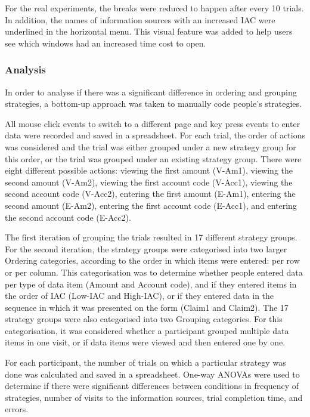 \begin{table}
\begin{itemize}
For the real experiments, the breaks were reduced to happen after every 10 trials. In addition, the names of information sources with an increased IAC were underlined in the horizontal menu. This visual feature was added to help users see which windows had an increased time cost to open.

\subsubsection{Analysis}
In order to analyse if there was a significant difference in ordering and grouping strategies, a bottom-up approach was taken to manually code people's strategies.

All mouse click events to switch to a different page and key press events to enter data were recorded and saved in a spreadsheet. For each trial, the order of actions was considered and the trial was either grouped under a new strategy group for this order, or the trial was grouped under an existing strategy group. There were eight different possible actions: viewing the first amount (V-Am1), viewing the second amount (V-Am2), viewing the first account code (V-Acc1), viewing the second account code (V-Acc2), entering the first amount (E-Am1), entering the second amount (E-Am2), entering the first account code (E-Acc1), and entering the second account code (E-Acc2).

The first iteration of grouping the trials resulted in 17 different strategy groups. For the second iteration, the strategy groups were categorised into two larger Ordering categories, according to the order in which items were entered: per row or per column. This categorisation was to determine whether people entered data per type of data item (Amount and Account code), and if they entered items in the order of IAC (Low-IAC and High-IAC), or if they entered data in the sequence in which it was presented on the form (Claim1 and Claim2). The 17 strategy groups were also categorised into two Grouping categories. For this categorisation, it was considered whether a participant grouped multiple data items in one visit, or if data items were viewed and then entered one by one. 

For each participant, the number of trials on which a particular strategy was done was calculated and saved in a spreadsheet. One-way ANOVAs were used to determine if there were significant differences between conditions in frequency of strategies, number of visits to the information sources, trial completion time, and errors. 


\end{itemize}
\end{table}
